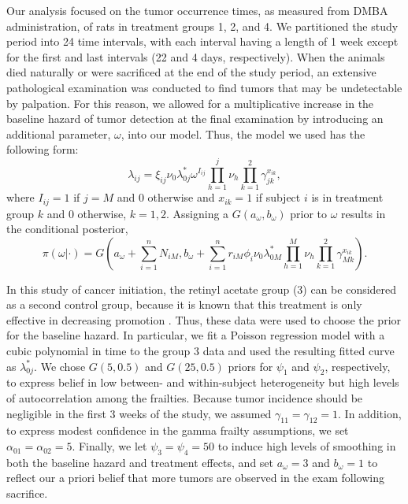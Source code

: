 \documentclass[10pt, letterpaper]{article}
\begin{document}
Our analysis focused on the tumor occurrence times, as measured from DMBA administration, of rats in treatment groups 1, 2, and 4. We partitioned the study period into 24 time intervals, with each interval having a length of 1 week except for the first and last intervals (22 and 4 days, respectively). When the animals died naturally or were sacrificed at the end of the study period, an extensive pathological examination was conducted to find tumors that may be undetectable by palpation. For this reason, we allowed for a multiplicative increase in the baseline hazard of tumor detection at the final examination by introducing an additional parameter, $\omega$, into our model. Thus, the model we used has the following form:
\begin{equation} \label{eq:8}
\lambda_{ij} = \xi_{ij} \nu_0 \lambda_{0j}^* \omega^{I_{ij}} \prod_{h=1}^{j} \nu_h \prod_{k=1}^{2} \gamma_{jk}^{x_{ik}}, 
\end{equation}
where $I_{ij} = 1$ if $j = M$ and 0 otherwise and $x_{ik} = 1$ if subject $i$ is in treatment group $k$ and 0 otherwise, $k = 1, 2$. Assigning a $G(a_\omega, b_\omega)$ prior to $\omega$ results in the conditional posterior,
\begin{equation} \label{eq:9}
\pi(\omega | \cdot) = G \left( a_\omega + \sum_{i=1}^{n} N_{iM}, b_\omega + \sum_{i=1}^{n} r_{iM} \phi_i \nu_0 \lambda_{0M}^* \prod_{h=1}^{M} \nu_h \prod_{k=1}^{2} \gamma_{Mk}^{x_{ik}} \right).
\end{equation}

In this study of cancer initiation, the retinyl acetate group (3) can be considered as a second control group, because it is known that this treatment is only effective in decreasing promotion \citep{Grubbs1991}. Thus, these data were used to choose the prior for the baseline hazard. In particular, we fit a Poisson regression model with a cubic polynomial in time to the group 3 data and used the resulting fitted curve as $\lambda_{0j}^*$. We chose $G(5, 0.5)$ and $G(25, 0.5)$ priors for $\psi_1$ and $\psi_2$, respectively, to express belief in low between- and within-subject heterogeneity but high levels of autocorrelation among the frailties. Because tumor incidence should be negligible in the first 3 weeks of the study, we assumed $\gamma_{11} = \gamma_{12} = 1$. In addition, to express modest confidence in the gamma frailty assumptions, we set $\alpha_{01} = \alpha_{02} = 5$. Finally, we let $\psi_3 = \psi_4 = 50$ to induce high levels of smoothing in both the baseline hazard and treatment effects, and set $a_\omega = 3$ and $b_\omega = 1$ to reflect our a priori belief that more tumors are observed in the exam following sacrifice.
\end{document}
